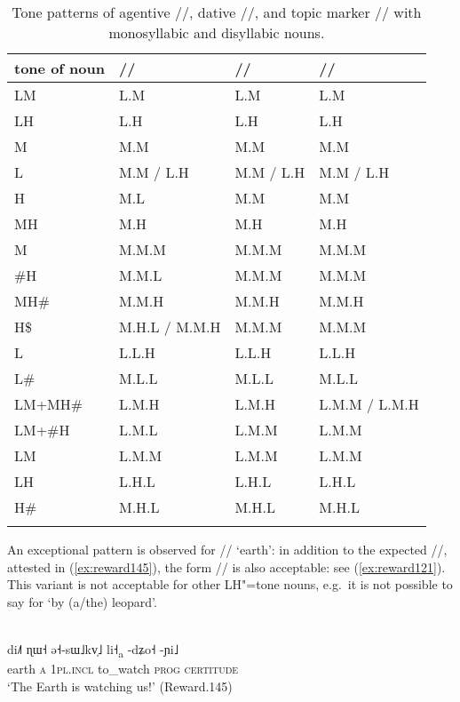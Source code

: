 \begin{subtables}
\begin{table}%
\caption{\label{tab:topicabstract}Tone patterns of {agentive} //, {dative} //, and {topic} marker
	// with {monosyllabic} and disyllabic nouns.}
  \begin{tabularx}{\textwidth}{ Q Q Q Q }
\lsptoprule
	tone of noun & // & // & //\\ \midrule
	LM & L.M & L.M & L.M\\
	LH & L.H & L.H & L.H\\
	M & M.M & M.M & M.M\\
	L & M.M / L.H & M.M / L.H & M.M / L.H\\
	H & M.L & M.M & M.M\\
	MH & M.H & M.H & M.H\\ \addlinespace \hdashline \addlinespace
	M & M.M.M & M.M.M & M.M.M\\
	\#H & M.M.L & M.M.M & M.M.M\\
	MH\# & M.M.H & M.M.H & M.M.H\\
	H\$ & M.H.L / M.M.H & M.M.M & M.M.M\\
	L & L.L.H & L.L.H & L.L.H\\
	L\# & M.L.L & M.L.L & M.L.L\\
	LM+MH\# & L.M.H & L.M.H & L.M.M / L.M.H\\
	LM+\#H & L.M.L & L.M.M & L.M.M\\
	LM & L.M.M & L.M.M & L.M.M\\
	LH & L.H.L & L.H.L & L.H.L\\
	H\# & M.H.L & M.H.L & M.H.L\\
\lspbottomrule
\end{tabularx}
\end{table}
\end{subtables}

 \largerpage
An exceptional pattern is observed for // ‘earth’: in addition to the expected
//, attested in (\ref{ex:reward145}), the form // is also acceptable: see (\ref{ex:reward121}). This variant is not acceptable for other LH"=tone nouns, e.g.~it is
not possible to say  for ‘by \mbox{(a/the)} leopard’.

\begin{exe}
	\ex
	\label{ex:reward145}
	\\
	\gll di˩˥	ɳɯ˧		ə˧-sɯ˩kv̩˩	li˧\textsubscript{a}		-dʑo˧		-ɲi˩\\
	earth		\textsc{a}	\textsc{1pl.incl}	to\_watch		\textsc{prog}			\textsc{certitude}\\
	\glt ‘The Earth is watching us!’ (Reward.145)
\end{exe}

